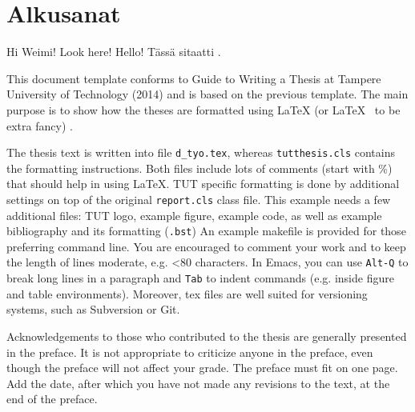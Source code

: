 \documentclass[12pt,a4paper,finnish]{tutthesis}
\begin{document}


\makeatother %

\chapter*{Alkusanat}

Hi Weimi! Look here! Hello! Tässä sitaatti \parencite{muelaner2015hybrid}.

This document template conforms to Guide to Writing a Thesis at
Tampere University of Technology (2014) and is based on the previous
template. The main purpose is to show how the theses are formatted
using LaTeX (or \LaTeX ~ to be extra fancy) .

The thesis text is written into file \texttt{d\_tyo.tex}, whereas
\texttt{tutthesis.cls} contains the formatting instructions. Both
files include lots of comments (start with \%) that should help in
using LaTeX. TUT specific formatting is done by additional settings on
top of the original \texttt{report.cls} class file. This example needs a
few additional files: TUT logo, example figure, example code, as well
as example bibliography and its formatting (\texttt{.bst}) An example
makefile is provided for those preferring command line. You are
encouraged to comment your work and to keep the length of lines
moderate, e.g. <80 characters. In Emacs, you can use \texttt{Alt-Q} to
break long lines in a paragraph and \texttt{Tab} to indent commands
(e.g. inside figure and table environments). Moreover, tex files are
well suited for versioning systems, such as Subversion or Git.  


Acknowledgements to those who contributed to the thesis are generally
presented in the preface. It is not appropriate to criticize anyone in
the preface, even though the preface will not affect your grade. The
preface must fit on one page. Add the date, after which you have not
made any revisions to the text, at the end of the preface.
\end{document}
